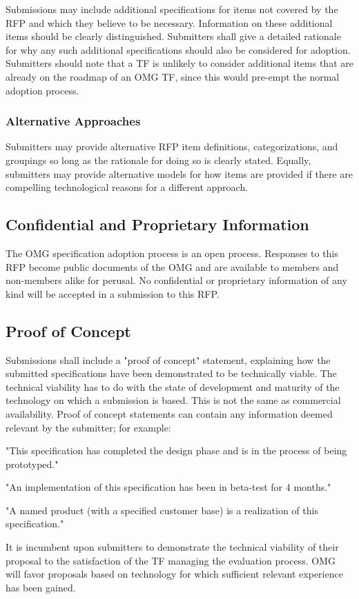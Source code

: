 Submissions may include additional specifications for items not covered by the RFP and which they believe to be necessary. Information on these additional items should be clearly distinguished. Submitters shall give a detailed rationale for why any such additional specifications should also be considered for adoption. Submitters should note that a TF is unlikely to consider additional items that are already on the roadmap of an OMG TF, since this would pre-empt the normal adoption process.


\subsubsection{Alternative Approaches}

Submitters may provide alternative RFP item definitions, categorizations, and groupings so long as the rationale for doing so is clearly stated. Equally, submitters may provide alternative models for how items are provided if there are compelling technological reasons for a different approach.


\subsection{Confidential and Proprietary Information}

The OMG specification adoption process is an open process. Responses to this RFP become public documents of the OMG and are available to members and non-members alike for perusal. No confidential or proprietary information of any kind will be accepted in a submission to this RFP.


\subsection{Proof of Concept}

Submissions shall include a "proof of concept" statement, explaining how the submitted specifications have been demonstrated to be technically viable. The technical viability has to do with the state of development and maturity of the technology on which a submission is based. This is not the same as commercial availability. Proof of concept statements can contain any information deemed relevant by the submitter; for example:
\begin{adjustwidth}{2em}{}
"This specification has completed the design phase and is in the process of being prototyped."
	
	"An implementation of this specification has been in beta-test for 4 months."
	
	"A named product (with a specified customer base) is a realization of this specification."
\end{adjustwidth}		
It is incumbent upon submitters to demonstrate the technical viability of their proposal to the satisfaction of the TF managing the evaluation process. OMG will favor proposals based on technology for which sufficient relevant experience has been gained.


